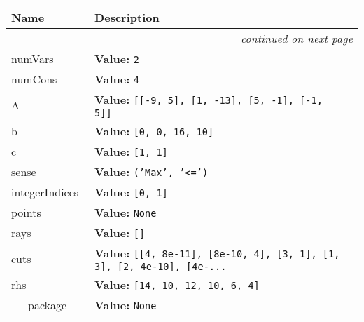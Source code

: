    \vspace{-1cm}
\hspace{\varindent}\begin{longtable}{|p{\varnamewidth}|p{\vardescrwidth}|l}
\cline{1-2}
\cline{1-2} \centering \textbf{Name} & \centering \textbf{Description}& \\
\cline{1-2}
\endhead\cline{1-2}\multicolumn{3}{r}{\small\textit{continued on next page}}\\\endfoot\cline{1-2}
\endlastfoot\raggedright n\-u\-m\-V\-a\-r\-s\- & \raggedright \textbf{Value:} 
{\tt 2}&\\
\cline{1-2}
\raggedright n\-u\-m\-C\-o\-n\-s\- & \raggedright \textbf{Value:} 
{\tt 4}&\\
\cline{1-2}
\raggedright A\- & \raggedright \textbf{Value:} 
{\tt \texttt{[}\texttt{[}-9\texttt{, }5\texttt{]}\texttt{, }\texttt{[}1\texttt{, }-13\texttt{]}\texttt{, }\texttt{[}5\texttt{, }-1\texttt{]}\texttt{, }\texttt{[}-1\texttt{, }5\texttt{]}\texttt{]}}&\\
\cline{1-2}
\raggedright b\- & \raggedright \textbf{Value:} 
{\tt \texttt{[}0\texttt{, }0\texttt{, }16\texttt{, }10\texttt{]}}&\\
\cline{1-2}
\raggedright c\- & \raggedright \textbf{Value:} 
{\tt \texttt{[}1\texttt{, }1\texttt{]}}&\\
\cline{1-2}
\raggedright s\-e\-n\-s\-e\- & \raggedright \textbf{Value:} 
{\tt \texttt{(}\texttt{'}\texttt{Max}\texttt{'}\texttt{, }\texttt{'}\texttt{{\textless}=}\texttt{'}\texttt{)}}&\\
\cline{1-2}
\raggedright i\-n\-t\-e\-g\-e\-r\-I\-n\-d\-i\-c\-e\-s\- & \raggedright \textbf{Value:} 
{\tt \texttt{[}0\texttt{, }1\texttt{]}}&\\
\cline{1-2}
\raggedright p\-o\-i\-n\-t\-s\- & \raggedright \textbf{Value:} 
{\tt None}&\\
\cline{1-2}
\raggedright r\-a\-y\-s\- & \raggedright \textbf{Value:} 
{\tt \texttt{[}\texttt{]}}&\\
\cline{1-2}
\raggedright c\-u\-t\-s\- & \raggedright \textbf{Value:} 
{\tt \texttt{[}\texttt{[}4\texttt{, }8e-11\texttt{]}\texttt{, }\texttt{[}8e-10\texttt{, }4\texttt{]}\texttt{, }\texttt{[}3\texttt{, }1\texttt{]}\texttt{, }\texttt{[}1\texttt{, }3\texttt{]}\texttt{, }\texttt{[}2\texttt{, }4e-10\texttt{]}\texttt{, }\texttt{[}4e-\texttt{...}}&\\
\cline{1-2}
\raggedright r\-h\-s\- & \raggedright \textbf{Value:} 
{\tt \texttt{[}14\texttt{, }10\texttt{, }12\texttt{, }10\texttt{, }6\texttt{, }4\texttt{]}}&\\
\cline{1-2}
\raggedright \_\-\_\-p\-a\-c\-k\-a\-g\-e\-\_\-\_\- & \raggedright \textbf{Value:} 
{\tt None}&\\
\cline{1-2}
\end{longtable}


